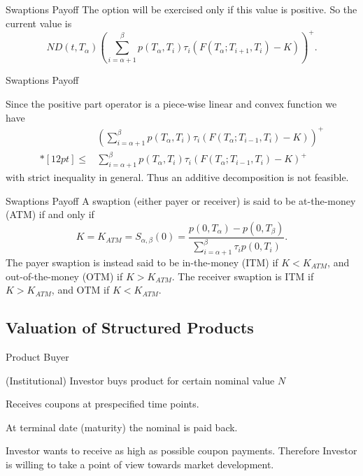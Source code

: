 
{Swaptions Payoff}
The option will be exercised only if this
value is positive. So the current value is
$$
ND(t,T_{\alpha})\left(\sum_{i=\alpha+1}^{\beta}p(T_{\alpha},T_i)\tau_i
(F(T_{\alpha};T_{i+1},T_i)-K)\right)^+.
$$

{Swaptions Payoff}

Since the positive part operator is a
piece-wise linear and convex function we have
$$\begin{array}{ll}
&\displaystyle
\left(\sum_{i=\alpha+1}^{\beta}p(T_{\alpha},T_i)\tau_i(F(T_{\alpha};T_{i-1},T_i)-K)\right)^+\\*[12pt]
\leq&\displaystyle \sum_{i=\alpha+1}^{\beta}p(T_{\alpha},T_i)\tau_i(F(T_{\alpha};T_{i-1},T_i)-K)^+
\end{array}
$$
with strict inequality in general. Thus an additive decomposition is not
feasible.


{Swaptions Payoff}
A swaption (either payer or receiver) is said to be at-the-money
(ATM) if and only if
$$
K=K_{ATM}=S_{\alpha,\beta}(0)=\frac{p(0,T_{\alpha})-p(0,T_{\beta})}{\sum_{i=\alpha+1}^{\beta}\tau_ip(0,T_i)}.
$$
The payer swaption is instead said to be in-the-money (ITM) if
$K<K_{ATM}$, and out-of-the-money (OTM) if $K>K_{ATM}$. The
receiver swaption is ITM if $K>K_{ATM}$, and OTM if $K<K_{ATM}$.

\subsection{Valuation of Structured Products}

{Product Buyer}
\item<1-> (Institutional) Investor buys product for certain nominal value $N$
\item<2-> Receives coupons at prespecified time points.
\item<3-> At terminal date (maturity) the nominal is paid back.
\item<4-> Investor wants to receive as high as possible coupon payments. Therefore Investor is willing to take a point of view towards market development.

